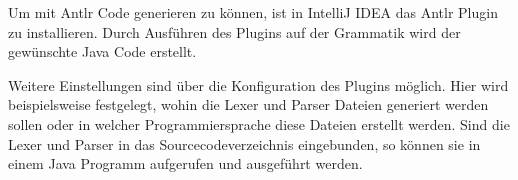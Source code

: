 Um mit Antlr Code generieren zu können, ist in IntelliJ IDEA das Antlr Plugin zu installieren. Durch Ausführen des Plugins auf der Grammatik wird der gewünschte Java Code erstellt.

Weitere Einstellungen sind über die Konfiguration des Plugins möglich. Hier wird beispielsweise festgelegt, wohin die Lexer und Parser Dateien generiert werden sollen oder in welcher Programmiersprache diese Dateien erstellt werden. 
Sind die Lexer und Parser in das Sourcecodeverzeichnis eingebunden, so können sie in einem Java Programm aufgerufen und ausgeführt werden.

